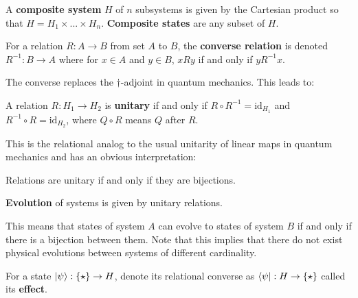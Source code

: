 \begin{axiom}
A \textbf{composite system} $H$ of $n$ subsystems is given by the Cartesian product so that $H = H_1\times...\times H_n$. \textbf{Composite states} are any subset of $H$.
\end{axiom}

\begin{defn}
For a relation $R:A\to B$ from set $A$ to $B$, the \textbf{converse relation} is denoted $R^{-1}:B\to A$ where for $x\in A$ and $y\in B$, $xRy$ if and only if $yR^{-1}x$.
\end{defn}

\noindent The converse replaces the $\dagger$-adjoint in quantum mechanics. This leads to:

\begin{defn}
A relation $R:H_1\to H_2$ is \textbf{unitary} if and only if $R\circ R^{-1} = \mbox{id}_{H_1}$ and $R^{-1}\circ R = \mbox{id}_{H_2}$, where $Q\circ R$ means $Q$ after $R$.
\end{defn}

\noindent This is the relational analog to the usual unitarity of linear maps in quantum mechanics and has an obvious interpretation:

\begin{theorem}
\label{cor:bijections}
Relations are unitary if and only if they are bijections.
\end{theorem}

\begin{axiom}
\textbf{Evolution} of systems is given by unitary relations.
\end{axiom}

\noindent This means that states of system $A$ can evolve to states of system $B$ if and only if there is a bijection between them. Note that this implies that there do not exist physical evolutions between systems of different cardinality. %

\begin{defn}
For a state $| \psi \rangle:\{\star\}\to H$, denote its relational converse as $\langle \psi |:H\to\{\star\}$ called its \textbf{effect}.
\end{defn}

